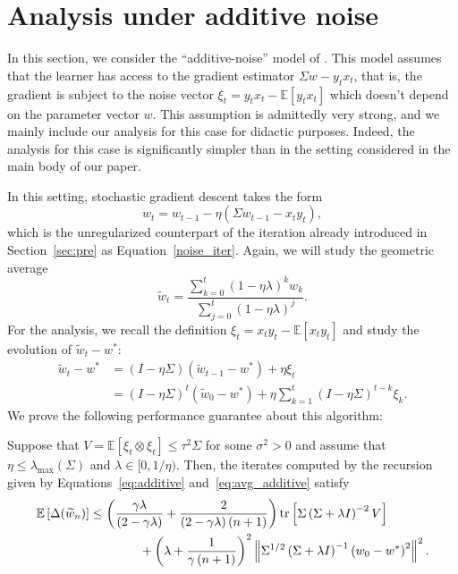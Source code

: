 \documentclass[final,12pt]{colt2018} %
\newcommand{\trace}[1]{\mbox{\normalfont tr}\left[#1\right]}
\newcommand{\EE}[1]{\mathbb{E}\left[#1\right]}
\newcommand{\norm}[1]{\left\|#1\right\|}
\newcommand{\pa}[1]{\left(#1\right)}
\newcommand{\wt}{\widetilde}
\newcommand{\tw}{\wt{w}}
\begin{document}
\section{Analysis under additive noise}\label{app:additive}
In this section, we consider the ``additive-noise'' model of \citet{DFB16}.  This model assumes that the learner has 
access to the gradient estimator $\Sigma w - y_t x_t$, that is, the gradient is subject to the noise vector $\xi_t = y_t x_t - 
\EE{y_t x_t}$ which doesn't depend on the parameter vector $w$. This assumption is admittedly very strong, and we mainly include our 
analysis for this case for didactic purposes. Indeed, the analysis for this case is significantly simpler than in the setting considered in 
the main body of our paper.

In this setting, stochastic gradient descent takes the form
\begin{equation}\label{eq:additive}
w_{t} = w_{t-1} - \eta (\Sigma w_{t-1} - x_{t} y_{t}),
\end{equation}
which is the unregularized counterpart of the iteration already introduced in Section~\ref{sec:pre} as Equation~\eqref{noise_iter}.
Again, we will study the geometric average
\begin{equation}\label{eq:avg_additive}
 \tw_t = \frac{\sum_{k=0}^{t} \pa{1-\eta\lambda}^k w_k}{\sum_{j=0}^t (1-\eta\lambda)^j}.
\end{equation}
For the analysis, we recall the definition $\xi_t = x_t y_t - \EE{x_t y_t}$ and study the evolution of $\tw_t - w^*$:
\begin{align*}
 \tw_t - w^* &= \pa{I - \eta\Sigma} \pa{\tw_{t-1} - w^*} + \eta \xi_t
 \\
 &= \pa{I - \eta\Sigma}^t \pa{\tw_{0} - w^*} + \eta \sum_{k=1}^t \pa{I - \eta\Sigma}^{t-k} \xi_k.
\end{align*}
We prove the following performance guarantee about this algorithm:
\begin{proposition}
 Suppose that $V = \EE{\xi_t\otimes \xi_t} \le \tau^2 \Sigma$ for some $\sigma^2>0$ and assume that $\eta\le \lambda_{\max}(\Sigma)$ and 
$\lambda \in [0,1/\eta)$. Then, the iterates computed by the recursion given by Equations~\eqref{eq:additive} 
and~\eqref{eq:avg_additive} satisfy
 \begin{align*}
 \EE{\Delta(\tw_n)}
 &\le \pa{\frac{\gamma\lambda}{\pa{2-\gamma\lambda}} + 
\frac{2}{ \pa{2-\gamma\lambda}\pa{n+1}}}\trace{\Sigma \pa{\Sigma + \lambda I}^{-2} V}
 \\
 &\qquad\qquad + \pa{\lambda + \frac{1}{\gamma\pa{n+1}}}^2 \norm{\Sigma^{1/2}\pa{\Sigma + \lambda I}^{-1} \pa{w_0 -
w^*}^2}^2.
\end{align*}
\end{proposition}
\end{document}
